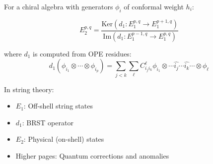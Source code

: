 \begin{example}
For a chiral algebra with generators $\phi_i$ of conformal weight $h_i$:

\[E_2^{p,q} = \frac{\text{Ker}(d_1: E_1^{p,q} \to E_1^{p+1,q})}{\text{Im}(d_1: E_1^{p-1,q} \to E_1^{p,q})}\]

where $d_1$ is computed from OPE residues:
\[d_1(\phi_{i_1} \otimes \cdots \otimes \phi_{i_p}) = \sum_{j<k} \sum_\ell C_{i_j i_k}^\ell \phi_{i_1} \otimes \cdots \widehat{i_j} \cdots \widehat{i_k} \cdots \otimes \phi_\ell\]
\end{example}

\begin{remark}
In string theory:
\begin{itemize}
\item $E_1$: Off-shell string states
\item $d_1$: BRST operator
\item $E_2$: Physical (on-shell) states
\item Higher pages: Quantum corrections and anomalies
\end{itemize}
\end{remark}
